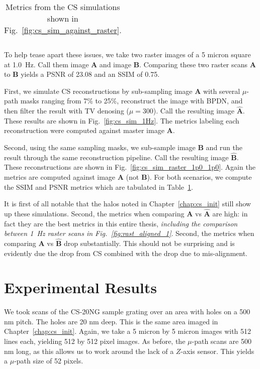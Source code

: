 \begin{table}[t!]
  \centering
  \caption{Metrics from the CS simulations shown in
    Fig.~\ref{fig:cs_sim_against_raster}.}
  \begin{tabular}{ccccc}
    
  \end{tabular}
  \label{tab:cs_sim}
\end{table}

To help tease apart these issues, we take two raster images of a 5 micron square at 1.0~Hz. Call them image \textbf{A} and image \textbf{B}. Comparing these two raster scans \textbf{A} to \textbf{B} yields a PSNR of 23.08 and an SSIM of 0.75.

First, we simulate CS reconstructions by sub-sampling image \textbf{A} with several $\mu$-path masks ranging from 7\% to 25\%, reconstruct the image with BPDN, and then filter the result with TV denosing ($\mu=300$). Call the resulting image $\hat{\mathbf{A}}$. These results are shown in Fig.~\ref{fig:cs_sim_1Hz}. The metrics labeling each reconstruction were computed against master image \textbf{A}.

Second, using the same sampling masks, we sub-sample image \textbf{B} and run the result through the same reconstruction pipeline. Call the resulting image $\hat{\mathbf{B}}$. These reconstructions are shown in Fig.~\ref{fig:cs_sim_raster_1p0_1p0}. Again the metrics are computed against image \textbf{A} (not \textbf{B}). For both scenarios, we compute the SSIM and PSNR metrics which are tabulated in Table~\ref{tab:cs_sim}.

It is first of all notable that the halos noted in Chapter~\ref{chap:cs_init} still show up these simulations.
Second, the metrics when comparing \textbf{A} vs $\mathbf{\hat{A}}$ are high: in fact they are the best metrics in this entire thesis, \textit{including the comparison between 1~Hz raster scans in Fig.~\ref{fig:rast_aligned_1}}. Second, the metrics when comparing \textbf{A} vs $\mathbf{\hat{B}}$ drop substantially. This should not be surprising and is evidently due the drop from CS combined with the drop due to mis-alignment. 



\section{Experimental Results}\label{sec:results:final}
We took scans of the CS-20NG sample grating over an area with holes on a 500 nm pitch. The holes are 20 nm deep. This is the same area imaged in Chapter~\ref{chap:cs_init}. Again, we take a 5 micron by 5 micron images with 512 lines each, yielding 512 by 512 pixel images. As before, the $\mu$-path scans are 500 nm long, as this allows us to work around the lack of a $Z$-axis sensor. This yields a $\mu$-path size of 52 pixels.

